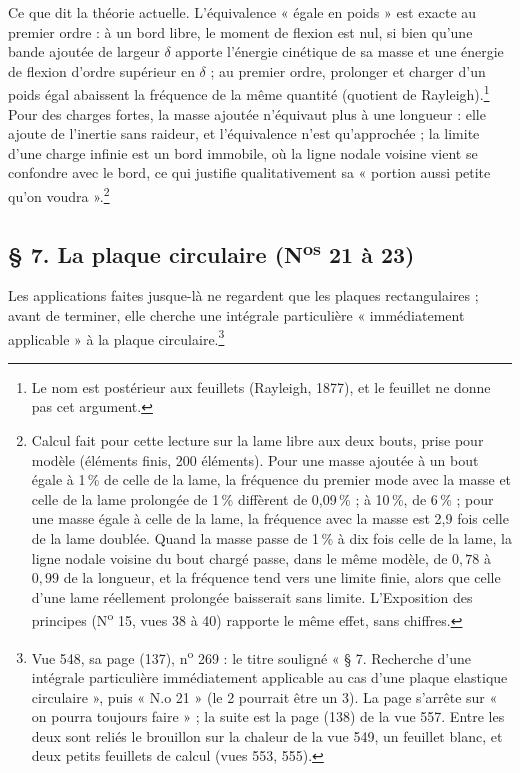\documentclass[11pt,a4paper]{article}
\begin{document}
Ce que dit la théorie actuelle. L'équivalence « égale en poids » est exacte au
premier ordre : à un bord libre, le moment de flexion est nul, si bien qu'une
bande ajoutée de largeur $\delta$ apporte l'énergie cinétique de sa masse et une
énergie de flexion d'ordre supérieur en $\delta$ ; au premier ordre, prolonger
et charger d'un poids égal abaissent la fréquence de la même quantité (quotient
de Rayleigh).\footnote{Le nom est postérieur aux feuillets (Rayleigh, 1877), et
le feuillet ne donne pas cet argument.} Pour des charges fortes, la masse
ajoutée n'équivaut plus à une longueur : elle ajoute de l'inertie sans
raideur, et l'équivalence n'est qu'approchée ; la limite d'une charge
infinie est un bord immobile, où la ligne nodale voisine vient se confondre avec
le bord, ce qui justifie qualitativement sa « portion aussi petite qu'on
voudra ».\footnote{Calcul fait pour cette lecture sur la lame libre aux deux
bouts, prise pour modèle (éléments finis, 200 éléments). Pour une masse ajoutée à
un bout égale à 1\,\% de celle de la lame, la fréquence du premier mode avec la
masse et celle de la lame prolongée de 1\,\% diffèrent de 0{,}09\,\% ; à 10\,\%,
de 6\,\% ; pour une masse égale à celle de la lame, la fréquence avec la masse est
2,9 fois celle de la lame doublée. Quand la masse passe de 1\,\% à dix fois celle
de la lame, la ligne nodale voisine du bout chargé passe, dans le même modèle, de
$0{,}78$ à $0{,}99$ de la longueur, et la fréquence tend vers une limite finie,
alors que celle d'une lame réellement prolongée baisserait sans limite.
L'Exposition des principes (N\textsuperscript{o} 15, vues 38 à 40) rapporte le
même effet, sans chiffres.}

\subsection*{§ 7. La plaque circulaire (N\textsuperscript{os} 21 à 23)}

Les applications faites jusque-là ne regardent que les plaques
rectangulaires ; avant de terminer, elle cherche une intégrale particulière
« immédiatement applicable » à la plaque circulaire.\footnote{Vue 548, sa page
(137), n\textsuperscript{o} 269 : le titre souligné « § 7. Recherche d'une
intégrale particulière immédiatement applicable au cas d'une plaque elastique
circulaire », puis « N.o 21 » (le 2 pourrait être un 3). La page s'arrête sur
« on pourra toujours faire » ; la suite est la page (138) de la vue 557. Entre
les deux sont reliés le brouillon sur la chaleur de la vue 549, un feuillet
blanc, et deux petits feuillets de calcul (vues 553, 555).}
\end{document}
